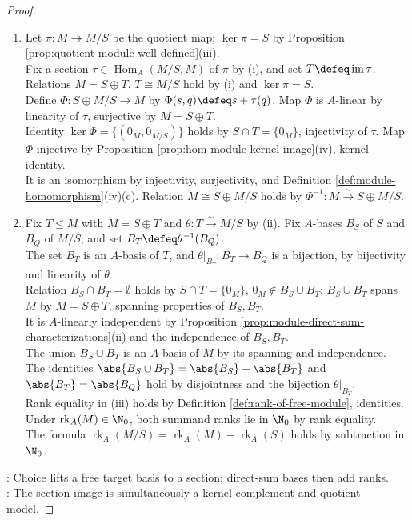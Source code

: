 \begin{theorem}
\begin{proof}
\begin{enumerate}[label=(\roman*)]
\item Let $\pi:M\twoheadrightarrow M/S$ be the quotient map; $\ker\pi=S$ by Proposition \ref{prop:quotient-module-well-defined}(iii).\\
Fix a section $\tau\in\operatorname{Hom}_A(M/S,M)$ of $\pi$ by (i), and set $T\defeq\operatorname{im}\tau$. Relations $M=S\oplus T$, $T\cong M/S$ hold by (i) and $\ker\pi=S$.\\
Define $\Phi:S\oplus M/S\to M$ by $\Phi(s,q)\defeq s+\tau(q)$. Map $\Phi$ is $A$-linear by linearity of $\tau$, surjective by $M=S\oplus T$.\\
Identity $\ker\Phi=\{(0_M,0_{M/S})\}$ holds by $S\cap T=\{0_M\}$, injectivity of $\tau$. Map $\Phi$ injective by Proposition \ref{prop:hom-module-kernel-image}(iv), kernel identity.\\
It is an isomorphism by injectivity, surjectivity, and Definition \ref{def:module-homomorphism}(iv)(c). Relation $M\cong S\oplus M/S$ holds by $\Phi^{-1}:M\xrightarrow{\sim}S\oplus M/S$.
\item Fix $T\leq M$ with $M=S\oplus T$ and $\theta:T\xrightarrow{\sim}M/S$ by (ii). Fix $A$-bases $B_S$ of $S$ and $B_Q$ of $M/S$, and set $B_T\defeq\theta^{-1}(B_Q)$.\\
The set $B_T$ is an $A$-basis of $T$, and $\theta|_{B_T}:B_T\to B_Q$ is a bijection, by bijectivity and linearity of $\theta$.\\
Relation $B_S\cap B_T=\emptyset$ holds by $S\cap T=\{0_M\}$, $0_M\notin B_S\cup B_T$; $B_S\cup B_T$ spans $M$ by $M=S\oplus T$, spanning properties of $B_S,B_T$.\\
It is $A$-linearly independent by Proposition \ref{prop:module-direct-sum-characterizations}(ii) and the independence of $B_S,B_T$.\\
The union $B_S\cup B_T$ is an $A$-basis of $M$ by its spanning and independence.\\
The identities $\abs{B_S\cup B_T}=\abs{B_S}+\abs{B_T}$ and $\abs{B_T}=\abs{B_Q}$ hold by disjointness and the bijection $\theta|_{B_T}$.\\
Rank equality in (iii) holds by Definition \ref{def:rank-of-free-module}, identities. Under $\operatorname{rk}_A(M)\in\N_0$, both summand ranks lie in $\N_0$ by rank equality.\\
The formula $\operatorname{rk}_A(M/S)=\operatorname{rk}_A(M)-\operatorname{rk}_A(S)$ holds by subtraction in $\N_0$.
\end{enumerate}
: Choice lifts a free target basis to a section; direct-sum bases then add ranks.\\
: The section image is simultaneously a kernel complement and quotient model.
\end{proof}
\end{theorem}
